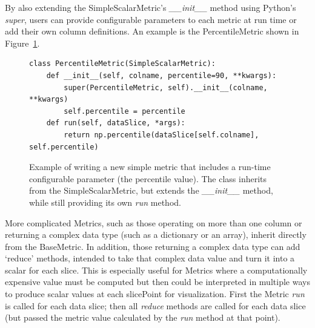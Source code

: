 \documentclass[]{spie}  %
\begin{document}
By also extending the SimpleScalarMetric's {\it \_\_init\_\_} method using Python's {\it super}, users can provide
configurable parameters to each metric at run time or add their own
column definitions. An example is the PercentileMetric shown in
Figure~\ref{fig:simpleconfigurablemetric}. 

\begin{figure}
\begin{lstlisting}[frame=single]
class PercentileMetric(SimpleScalarMetric):
    def __init__(self, colname, percentile=90, **kwargs):
        super(PercentileMetric, self).__init__(colname, **kwargs)
        self.percentile = percentile
    def run(self, dataSlice, *args):
        return np.percentile(dataSlice[self.colname], self.percentile)
\end{lstlisting}
\caption[]
{\label{fig:simpleconfigurablemetric} Example of writing a new simple
  metric that includes a run-time configurable parameter (the
  percentile value). The class inherits from the SimpleScalarMetric,
  but extends the {\it \_\_init\_\_} method, while still providing its
  own {\it run} method.}
\end{figure}

More complicated Metrics, such as those operating on more than one
column or returning a complex data type (such as a dictionary or an
array), inherit directly from the BaseMetric. In addition, those
returning a complex data type can add `reduce' methods, intended to
take that complex data value and turn it into a scalar for each
slice. This is especially useful for Metrics where a computationally
expensive value must be computed but then could be interpreted in
multiple ways to produce scalar values at each slicePoint for
visualization.  First the Metric {\it run} is called for each data
slice; then all {\it reduce} methods are called for each data slice
(but passed the metric value calculated by the {\it run} method at
that point).
\end{document}

